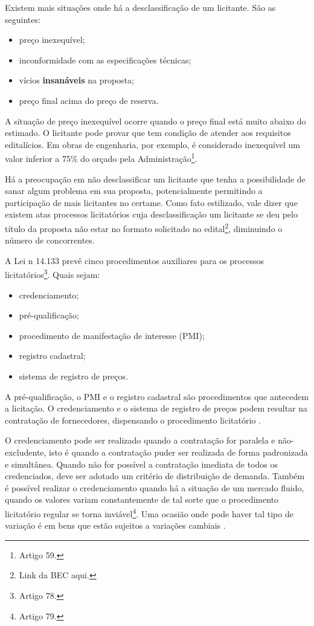 Existem mais situações onde há a desclassificação de um licitante. São as seguintes:
\begin{itemize}
    \item {preço inexequível;}
    \item {inconformidade com as especificações técnicas;}
    \item {vícios \textbf{insanáveis} na proposta;}
    \item {preço final acima do preço de reserva.}
\end{itemize}

A situação de preço inexequível ocorre quando o preço final está muito abaixo do estimado. O licitante pode provar que tem condição de atender aos requisitos editalícios. Em obras de engenharia, por exemplo, é considerado inexequível um valor inferior a 75\% do orçado pela Administração\footnote{Artigo 59.}.

Há a preocupação em não desclassificar um licitante que tenha a possibilidade de sanar algum problema em sua proposta, potencialmente permitindo a participação de mais licitantes no certame. Como fato estilizado, vale dizer que existem atas processos licitatórios cuja desclassificação um licitante se deu pelo título da proposta não estar no formato solicitado no edital\footnote{Link da BEC aqui.}, diminuindo o número de concorrentes.

A Lei n{\textordmasculine} 14.133 prevê cinco procedimentos auxiliares para os processos licitatórios\footnote{Artigo 78.}. Quais sejam:
\begin{itemize}
    \item {credenciamento;}
    \item {pré-qualificação;}
    \item {procedimento de manifestação de interesse (PMI);}
    \item {registro cadastral;}
    \item {sistema de registro de preços.}
\end{itemize}

A pré-qualificação, o PMI e o registro cadastral são procedimentos que antecedem a licitação. O credenciamento e o sistema de registro de preços podem resultar na contratação de fornecedores, dispensando o procedimento licitatório \citet{TCE2022}.

O credenciamento pode ser realizado quando a contratação for paralela e não-excludente, isto é quando a contratação puder ser realizada de forma padronizada e simultânea. Quando não for possível a contratação imediata de todos os credenciados, deve ser adotado um critério de distribuição de demanda. Também é possível realizar o credenciamento quando há a situação de um mercado fluido, quando os valores variam constantemente de tal sorte que o procedimento licitatório regular se torna inviável\footnote{Artigo 79.}. Uma ocasião onde pode haver tal tipo de variação é em bens que estão sujeitos a variações cambiais \citet{TCE2022}.

